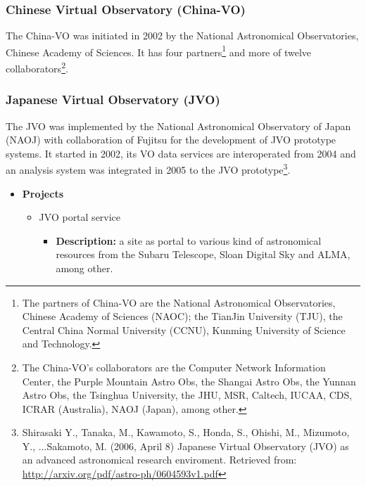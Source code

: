 \subsubsection{Chinese Virtual Observatory (China-VO)}
The China-VO was initiated in 2002 by the National Astronomical Observatories,
Chinese Academy of Sciences. It has four partners\footnote{The partners of
China-VO are the National Astronomical Observatories, Chinese Academy of
Sciences (NAOC); the TianJin University (TJU), the Central China Normal
University (CCNU), Kunming University of Science and Technology.} and more of
twelve collaborators\footnote{The China-VO's collaborators are the Computer
Network Information Center, the Purple Mountain Astro Obs, the Shangai Astro
Obs, the Yunnan Astro Obs, the Tsinghua University, the JHU, MSR, Caltech,
IUCAA, CDS, ICRAR (Australia), NAOJ (Japan), among other.}.


\subsubsection{Japanese Virtual Observatory (JVO)}
The JVO was implemented by the National Astronomical Observatory of Japan (NAOJ)
with collaboration of Fujitsu for the development of JVO prototype systems. It
started in 2002, its VO data services are interoperated from 2004 and an
analysis system was integrated in 2005 to the JVO prototype\footnote{Shirasaki
Y., Tanaka, M., Kawamoto, S., Honda, S., Ohishi, M., Mizumoto, Y., ...Sakamoto,
M. (2006, April 8) Japanese Virtual Observatory (JVO) as an advanced
astronomical research enviroment. Retrieved from:
\url{http://arxiv.org/pdf/astro-ph/0604593v1.pdf}}.

\begin{itemize}
\item \textbf{Projects}
\begin{itemize}
\item JVO portal service
\begin{itemize}
\item \textbf{Description:} a site as portal to various kind of astronomical
resources from the Subaru Telescope, Sloan Digital Sky and ALMA, among other.
\end{itemize}
\end{itemize}
\end{itemize}

